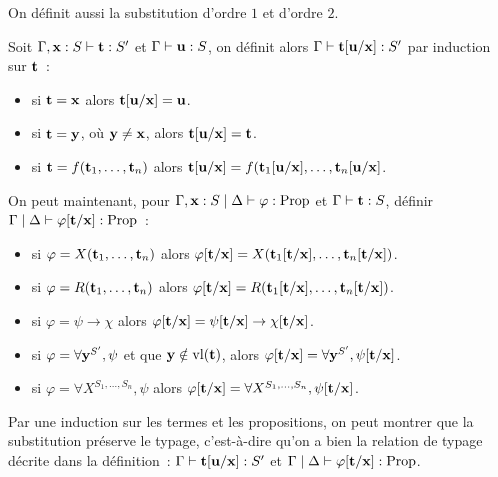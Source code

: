 \documentclass{article}
\begin{document}
On définit aussi la substitution d'ordre $1$ et d'ordre $2$.

\begin{defi}
    Soit $\Gamma, \mathbf{x} : S\vdash \mathbf{t} : S'$ et $\Gamma\vdash \mathbf{u} : S$, on définit alors $\Gamma\vdash \mathbf{t}[\mathbf{u}/\mathbf{x}] : S'$ par induction sur $\mathbf{t}$~:
    \begin{itemize}
        \item si $\mathbf{t} = \mathbf{x}$ alors $\mathbf{t}[\mathbf{u}/\mathbf{x}] = \mathbf{u}$.
        \item si $\mathbf{t} = \mathbf{y}$, où $\mathbf{y} \neq \mathbf{x}$, alors $\mathbf{t}[\mathbf{u}/\mathbf{x}] = \mathbf{t}$.
        \item si $\mathbf{t} = f(\mathbf{t}_1,\ldots,\mathbf{t}_n)$ alors $\mathbf{t}[\mathbf{u}/\mathbf{x}] = f(\mathbf{t}_1[\mathbf{u}/\mathbf{x}],\ldots,\mathbf{t}_n[\mathbf{u}/\mathbf{x}]$.
    \end{itemize}
    On peut maintenant, pour $\Gamma, \mathbf{x} : S\mid\Delta\vdash \varphi : \mathrm{Prop}$ et $\Gamma\vdash \mathbf{t} : S$, définir $\Gamma\mid\Delta\vdash\varphi[\mathbf{t}/\mathbf{x}] : \mathrm{Prop}$~:
    \begin{itemize}
        \item si $\varphi = X(\mathbf{t}_1,\ldots,\mathbf{t}_n)$ alors $\varphi[\mathbf{t}/\mathbf{x}] = X(\mathbf{t}_1[\mathbf{t}/\mathbf{x}],\ldots,\mathbf{t}_n[\mathbf{t}/\mathbf{x}])$.
        \item si $\varphi = R(\mathbf{t}_1,\ldots,\mathbf{t}_n)$ alors $\varphi[\mathbf{t}/\mathbf{x}] = R(\mathbf{t}_1[\mathbf{t}/\mathbf{x}],\ldots,\mathbf{t}_n[\mathbf{t}/\mathbf{x}])$.
        \item si $\varphi = \psi \to \chi$ alors $\varphi[\mathbf{t}/\mathbf{x}] = \psi[\mathbf{t}/\mathbf{x}] \to \chi[\mathbf{t}/\mathbf{x}]$.
        \item si $\varphi = \forall \mathbf{y}^{S'}, \psi$ et que $\mathbf{y}\notin \mathrm{vl}(\mathbf{t})$, alors $\varphi[\mathbf{t}/\mathbf{x}] = \forall \mathbf{y}^{S'}, \psi[\mathbf{t}/\mathbf{x}]$.
        \item si $\varphi = \forall X^{S_1,\ldots,S_n}, \psi$ alors $\varphi[\mathbf{t}/\mathbf{x}] = \forall X^{S_1,\ldots,S_n}, \psi[\mathbf{t}/\mathbf{x}]$.
    \end{itemize}
\end{defi}

Par une induction sur les termes et les propositions, on peut montrer que la substitution préserve le typage, c'est-à-dire qu'on a bien la relation de typage décrite dans la définition~: $\Gamma\vdash \mathbf{t}[\mathbf{u}/\mathbf{x}] : S'$ et $\Gamma\mid\Delta\vdash \varphi[\mathbf{t}/\mathbf{x}] : \mathrm{Prop}$.
\end{document}
